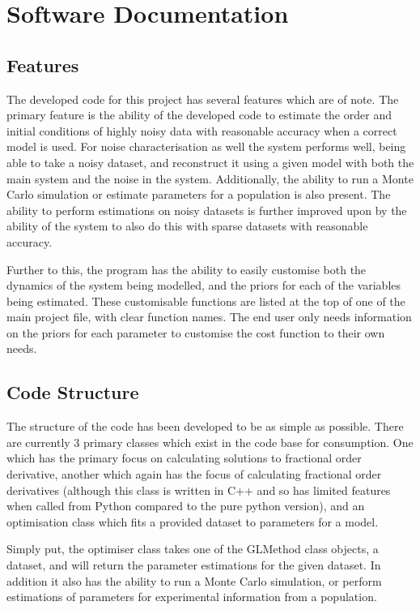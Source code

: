 \section{Software Documentation}

\subsection{Features}

The developed code for this project has several features which are of note. The primary feature is the ability of the developed code to estimate the order and initial conditions of highly noisy data with reasonable accuracy when a correct model is used. For noise characterisation as well the system performs well, being able to take a noisy dataset, and reconstruct it using a given model with both the main system and the noise in the system. Additionally, the ability to run a Monte Carlo simulation or estimate parameters for a population is also present. The ability to perform estimations on noisy datasets is further improved upon by the ability of the system to also do this with sparse datasets with reasonable accuracy.

Further to this, the program has the ability to easily customise both the dynamics of the system being modelled, and the priors for each of the variables being estimated. These customisable functions are listed at the top of one of the main project file, with clear function names. The end user only needs information on the priors for each parameter to customise the cost function to their own needs.

\subsection{Code Structure} \label{code_structure}

The structure of the code has been developed to be as simple as possible. There are currently 3 primary classes which exist in the code base for consumption. One which has the primary focus on calculating solutions to fractional order derivative, another which again has the focus of calculating fractional order derivatives (although this class is written in C++ and so has limited features when called from Python compared to the pure python version), and an optimisation class which fits a provided dataset to parameters for a model. 

Simply put, the optimiser class takes one of the GLMethod class objects, a dataset, and will return the parameter estimations for the given dataset. In addition it also has the ability to run a Monte Carlo simulation, or perform estimations of parameters for experimental information from a population.

